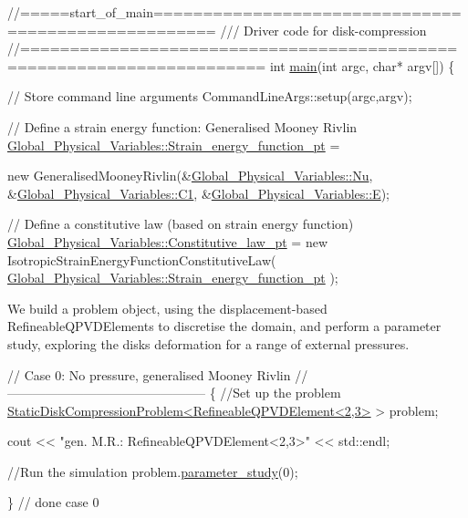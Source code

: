 \begin{DoxyCodeInclude}
\textcolor{comment}{//=====start\_of\_main====================================================}
\textcolor{comment}{/// Driver code for disk-compression}
\textcolor{comment}{}\textcolor{comment}{//======================================================================}
\textcolor{keywordtype}{int} \hyperlink{disk__compression_8cc_a0ddf1224851353fc92bfbff6f499fa97}{main}(\textcolor{keywordtype}{int} argc, \textcolor{keywordtype}{char}* argv[])
\{

 \textcolor{comment}{// Store command line arguments}
 CommandLineArgs::setup(argc,argv);
  
 \textcolor{comment}{// Define a strain energy function: Generalised Mooney Rivlin}
 \hyperlink{namespaceGlobal__Physical__Variables_a73135f793690b4386bf83bbefc7bf310}{Global\_Physical\_Variables::Strain\_energy\_function\_pt} =
       
  \textcolor{keyword}{new} GeneralisedMooneyRivlin(&\hyperlink{namespaceGlobal__Physical__Variables_a3962c36313826b19f216f6bbbdd6a477}{Global\_Physical\_Variables::Nu},
                              &\hyperlink{namespaceGlobal__Physical__Variables_a849754fa7155c1a31481674ce4845658}{Global\_Physical\_Variables::C1},
                              &\hyperlink{namespaceGlobal__Physical__Variables_a09a019474b7405b35da2437f7779bc7e}{Global\_Physical\_Variables::E});
 
 \textcolor{comment}{// Define a constitutive law (based on strain energy function)}
 \hyperlink{namespaceGlobal__Physical__Variables_a2a37fb040c832ee7a086bb13bb02a100}{Global\_Physical\_Variables::Constitutive\_law\_pt} = 
  \textcolor{keyword}{new} IsotropicStrainEnergyFunctionConstitutiveLaw(
   \hyperlink{namespaceGlobal__Physical__Variables_a73135f793690b4386bf83bbefc7bf310}{Global\_Physical\_Variables::Strain\_energy\_function\_pt}
      );

\end{DoxyCodeInclude}


We build a problem object, using the displacement-\/based {\ttfamily Refineable\+Q\+P\+V\+D\+Elements} to discretise the domain, and perform a parameter study, exploring the disk\textquotesingle{}s deformation for a range of external pressures.


\begin{DoxyCodeInclude}
 
 \textcolor{comment}{// Case 0: No pressure, generalised Mooney Rivlin}
 \textcolor{comment}{//-----------------------------------------------}
 \{
    \textcolor{comment}{//Set up the problem}
  \hyperlink{classStaticDiskCompressionProblem}{StaticDiskCompressionProblem<RefineableQPVDElement<2,3>}
       > problem;
  
  cout << \textcolor{stringliteral}{"gen. M.R.: RefineableQPVDElement<2,3>"} << std::endl;
  
  \textcolor{comment}{//Run the simulation}
  problem.\hyperlink{classStaticDiskCompressionProblem_ac64db4786efde78e70b1110422331b02}{parameter\_study}(0);
  
 \} \textcolor{comment}{// done case 0}

\end{DoxyCodeInclude}


